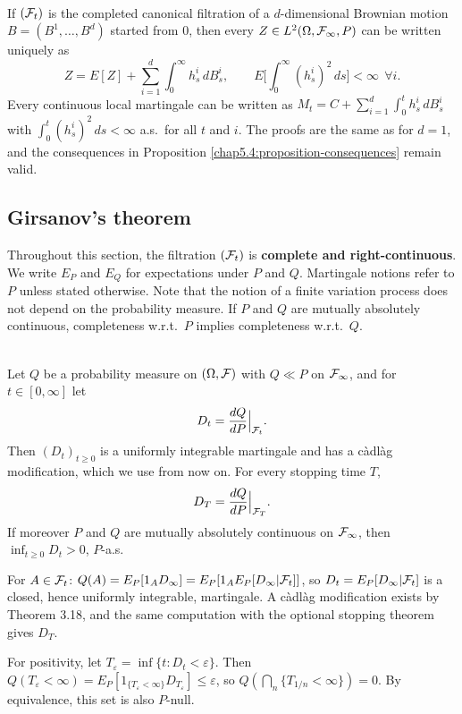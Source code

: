 \begin{remark}\label{chap5.4:remark-multidimensional}
\\
If $(\mathcal{F}_t)$ is the completed canonical filtration of a $d$-dimensional Brownian motion $B=(B^1,\dots,B^d)$ started from $0$, then every $Z\in L^2(\Omega,\mathcal{F}_\infty,P)$ can be written uniquely as
$$Z=E[Z]+\sum_{i=1}^d\int_0^\infty h^i_s\,dB^i_s,\qquad E\Big[\int_0^\infty(h^i_s)^2\,ds\Big]<\infty\ \ \forall i.$$
Every continuous local martingale can be written as $M_t=C+\sum_{i=1}^d\int_0^th^i_s\,dB^i_s$ with $\int_0^t(h^i_s)^2\,ds<\infty$ a.s.\ for all $t$ and $i$. The proofs are the same as for $d=1$, and the consequences in Proposition \ref{chap5.4:proposition-consequences} remain valid.
\end{remark}

\subsection{Girsanov's theorem}
Throughout this section, the filtration $(\mathcal{F}_t)$ is \textbf{complete and right-continuous}. We write $E_P$ and $E_Q$ for expectations under $P$ and $Q$. Martingale notions refer to $P$ unless stated otherwise. Note that the notion of a finite variation process does not depend on the probability measure. If $P$ and $Q$ are mutually absolutely continuous, completeness w.r.t.\ $P$ implies completeness w.r.t.\ $Q$.

\begin{proposition}\label{chap5.5:proposition-density_process}
\\
Let $Q$ be a probability measure on $(\Omega,\mathcal{F})$ with $Q\ll P$ on $\mathcal{F}_\infty$, and for $t\in[0,\infty]$ let
$$D_t=\frac{dQ}{dP}\Big|_{\mathcal{F}_t}.$$
Then $(D_t)_{t\geq0}$ is a uniformly integrable martingale and has a càdlàg modification, which we use from now on. For every stopping time $T$,
$$D_T=\frac{dQ}{dP}\Big|_{\mathcal{F}_T}.$$
If moreover $P$ and $Q$ are mutually absolutely continuous on $\mathcal{F}_\infty$, then $\inf_{t\geq0}D_t>0$, $P$-a.s.
\end{proposition}

\begin{proofidea}
For $A\in\mathcal{F}_t$: $Q(A)=E_P[1_AD_\infty]=E_P[1_AE_P[D_\infty|\mathcal{F}_t]]$, so $D_t=E_P[D_\infty|\mathcal{F}_t]$ is a closed, hence uniformly integrable, martingale. A càdlàg modification exists by Theorem 3.18, and the same computation with the optional stopping theorem gives $D_T$.

For positivity, let $T_\varepsilon=\inf\{t:D_t<\varepsilon\}$. Then $Q(T_\varepsilon<\infty)=E_P[1_{\{T_\varepsilon<\infty\}}D_{T_\varepsilon}]\leq\varepsilon$, so $Q(\bigcap_n\{T_{1/n}<\infty\})=0$. By equivalence, this set is also $P$-null.
\end{proofidea}

